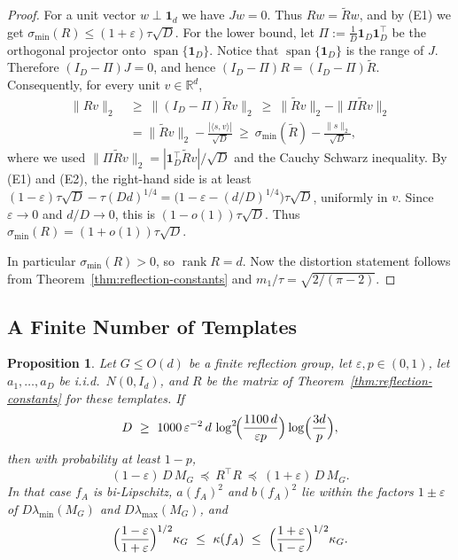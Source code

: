 \documentclass[11pt]{article}
\newcommand{\R}{\mathbb{R}}
\newcommand{\inner}[2]{\langle #1, #2 \rangle}
\newtheorem{prop}[theor]{Proposition}
\theoremstyle{definition}
\begin{document}
\begin{proof}
	For a unit vector $w\perp\mathbf 1_d$ we have $Jw=0$. Thus $Rw=\tilde Rw$, and by (E1) we
	get $\sigma_{\min}(R)\le(1+\varepsilon)\tau\sqrt D$. For the lower bound, let $\Pi:=\frac1D\mathbf 1_D\mathbf 1_D^{\!\top}$ be the
	orthogonal projector onto $\operatorname{span}\{\mathbf 1_D\}$. Notice that
	$\operatorname{span}\{\mathbf 1_D\}$ is the range of $J$. Therefore $(I_D-\Pi)J=0$, and hence
	$(I_D-\Pi)R=(I_D-\Pi)\tilde R$. Consequently, for every unit $v\in\R^d$,
	\[
	\begin{aligned}
	\|Rv\|_2\ &\ge\ \|(I_D-\Pi)\tilde Rv\|_2
	\ \ge\ \|\tilde Rv\|_2-\|\Pi\tilde Rv\|_2\\
	&=\|\tilde Rv\|_2-\frac{|\inner{s}{v}|}{\sqrt D}
	\ \ge\ \sigma_{\min}(\tilde R)-\frac{\|s\|_2}{\sqrt D},
	\end{aligned}
	\]
	where we used $\|\Pi\tilde Rv\|_2=|\mathbf 1_D^{\!\top}\tilde Rv|/\sqrt D$ and the
	Cauchy Schwarz inequality. By (E1) and (E2), the right-hand side is at least
	$(1-\varepsilon)\tau\sqrt D-\tau(Dd)^{1/4}=\bigl(1-\varepsilon-(d/D)^{1/4}\bigr)\tau\sqrt D$,
	uniformly in $v$. Since $\varepsilon\to0$ and $d/D\to0$, this is $(1-o(1))\tau\sqrt D$.
	Thus $\sigma_{\min}(R)=(1+o(1))\tau\sqrt D$.

	In particular $\sigma_{\min}(R)>0$, so $\operatorname{rank}R=d$. Now the distortion
	statement follows from Theorem~\ref{thm:reflection-constants} and
	$m_1/\tau=\sqrt{2/(\pi-2)}$.
\end{proof}

\subsection{A Finite Number of Templates}
\label{app:finiteD}


\begin{prop}
	\label{prop:finiteD}
	Let $G\le O(d)$ be a finite reflection group, let $\varepsilon,p\in(0,1)$, let
	$a_1,\dots,a_D$ be i.i.d.\ $N(0,I_d)$, and $R$ be the matrix of Theorem~\ref{thm:reflection-constants} for these
	templates. If
	\[
	D\ \ge\ 1000\,\varepsilon^{-2}\,d\,\log^2\!\Bigl(\frac{1100\,d}{\varepsilon p}\Bigr)
	\log\Bigl(\frac{3d}{p}\Bigr),
	\]
	then with probability at least $1-p$,
	\[
	(1-\varepsilon)\,D\,M_G\ \preceq\ R^{\!\top}R\ \preceq\ (1+\varepsilon)\,D\,M_G .
	\]
	In that case $f_A$ is bi-Lipschitz, $a(f_A)^2$ and $b(f_A)^2$ lie within the factors
	$1\pm\varepsilon$ of $D\lambda_{\min}(M_G)$ and $D\lambda_{\max}(M_G)$, and
	\[
	\Bigl(\frac{1-\varepsilon}{1+\varepsilon}\Bigr)^{1/2}\kappa_G\ \le\ \kappa(f_A)\ \le\
	\Bigl(\frac{1+\varepsilon}{1-\varepsilon}\Bigr)^{1/2}\kappa_G .
	\]
\end{prop}
\end{document}

